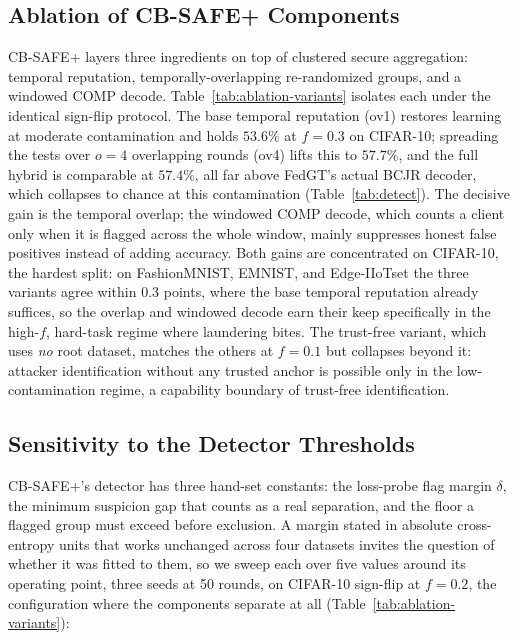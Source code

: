 \documentclass[lettersize,journal]{IEEEtran}
\begin{document}
\subsection{Ablation of CB-SAFE+ Components}
CB-SAFE+ layers three ingredients on top of clustered secure aggregation: temporal
reputation, temporally-overlapping re-randomized groups, and a windowed COMP decode.
Table~\ref{tab:ablation-variants} isolates each under the identical sign-flip
protocol. The base temporal reputation (ov1) restores learning at moderate
contamination and holds $53.6\%$ at $f{=}0.3$ on CIFAR-10; spreading the tests over
$o{=}4$ overlapping rounds (ov4) lifts this to $57.7\%$, and the full hybrid is
comparable at $57.4\%$, all far above FedGT's actual BCJR decoder, which collapses to
chance at this contamination (Table~\ref{tab:detect}). The decisive gain is the
temporal overlap; the windowed COMP decode, which counts a client only when it is
flagged across the whole window, mainly suppresses honest false positives instead of
adding accuracy. Both gains are concentrated on CIFAR-10, the hardest split: on FashionMNIST, EMNIST,
and Edge-IIoTset the three variants agree within $0.3$ points, where the base
temporal reputation already suffices, so the overlap and windowed decode earn their
keep specifically in the high-$f$, hard-task regime where laundering bites. The trust-free variant, which uses
\emph{no} root dataset, matches the others at $f{=}0.1$ but collapses beyond it:
attacker identification without any trusted anchor is possible only in the
low-contamination regime, a capability boundary of trust-free identification.



\subsection{Sensitivity to the Detector Thresholds}\label{sec:sensitivity}
CB-SAFE+'s detector has three hand-set constants: the loss-probe flag margin $\delta$,
the minimum suspicion gap that counts as a real separation, and the floor a flagged
group must exceed before exclusion. A margin stated in absolute cross-entropy units
that works unchanged across four datasets invites the question of whether it was
fitted to them, so we sweep each over five values around its operating point, three
seeds at 50 rounds, on CIFAR-10 sign-flip at $f{=}0.2$, the configuration where the
components separate at all (Table~\ref{tab:ablation-variants}):
\end{document}
